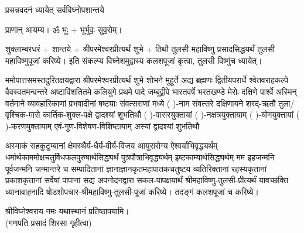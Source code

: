 
\setlength{\parindent}{0pt}




{प्रसन्नवदनं ध्यायेत् सर्वविघ्नोपशान्तये}

प्राणान्  आयम्य।  ॐ भूः + भूर्भुवः॒ सुव॒रोम्।


शुक्लाम्बरधरं + शान्तये + श्रीपरमेश्वरप्रीत्यर्थं शुभे + तिथौ तुलसी महाविष्णु प्रसादसिद्धयर्थं तुलसी महाविष्णुपूजां करिष्ये।
इति संकल्प्य विघ्नेशमुद्वास्य कलशपूजां कृत्वा, तुलसी विष्णुंच ध्यायेत्। 



ममोपात्तसमस्तदुरितक्षयद्वारा श्रीपरमेश्वर\-प्रीत्यर्थं शुभे शोभने मुहूर्ते अद्य ब्रह्मणः
द्वितीयपरार्धे श्वेतवराहकल्पे वैवस्वतमन्वन्तरे अष्टाविंशतितमे कलियुगे प्रथमे पादे
जम्बूद्वीपे भारतवर्षे भरत\-खण्डे मेरोः दक्षिणे पार्श्वे अस्मिन् वर्तमाने व्यावहारिकाणां
प्रभवादीनां षष्ट्याः संवत्सराणां मध्ये (  )-नाम संवत्सरे दक्षिणायने 
{शरद्}-ऋतौ  {तुला/वृश्चिक}-मासे कार्तिक-शुक्ल-पक्षे द्वादश्यां शुभतिथौ
(   )-वासरयुक्तायां 
(   )-नक्षत्र\-युक्तायाम्
(   )-योग\-युक्तायां
(   )-करण\-युक्तायाम् एवं-गुण-विशेषण-विशिष्टायाम् अस्यां द्वादश्यां शुभतिथौ 

अस्माकं सहकुटुम्बानां क्षेमस्थैर्य-धैर्य-वीर्य-विजय आयुरारोग्य ऐश्वर्याभिवृद्ध्यर्थम्
धर्मार्थकाममोक्ष\-चतुर्विधफलपुरुषार्थसिद्ध्यर्थं पुत्रपौत्राभि\-वृद्ध्यर्थम् इष्टकाम्यार्थसिद्ध्यर्थम्
मम इहजन्मनि पूर्वजन्मनि जन्मान्तरे च सम्पादितानां ज्ञानाज्ञानकृतमहा\-पातकचतुष्टय
व्यतिरिक्तानां रहस्यकृतानां प्रकाशकृतानां सर्वेषां पापानां सद्य अपनोदनद्वारा सकल-पापक्षयार्थं श्रीमहाविष्णु-तुलसी-प्रीत्यर्थं यावच्छक्ति ध्यानावाहनादि षोडशोपचार-श्रीमहाविष्णु-तुलसी-पूजां करिष्ये। तदङ्गं कलशपूजां च करिष्ये।


श्रीविघ्नेश्वराय नमः यथास्थानं प्रतिष्ठापयामि।\\
(गणपति प्रसादं शिरसा गृहीत्वा)













